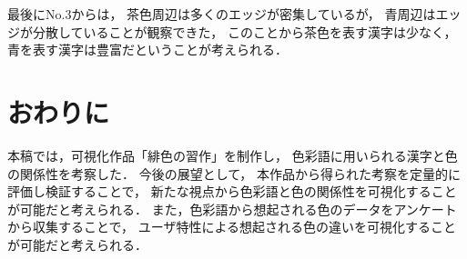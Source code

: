 \documentclass[a4j,twocolumn]{ujarticle} %
\newcommand{\workname}{緋色の習作}
\newcommand{\colorname}{色彩語}
\newcommand{\mysection}[1]{\vspace{-23pt}\section{#1}\vspace{-5pt}}
\begin{document}
最後にNo.3からは，
茶色周辺は多くのエッジが密集しているが，
青周辺はエッジが分散していることが観察できた，
このことから茶色を表す漢字は少なく，青を表す漢字は豊富だということが考えられる．

\mysection{おわりに}

本稿では，可視化作品「\workname{}」を制作し，
\colorname{}に用いられる漢字と色の関係性を考察した．
今後の展望として，
本作品から得られた考察を定量的に評価し検証することで，
新たな視点から\colorname{}と色の関係性を可視化することが可能だと考えられる．
また，\colorname{}から想起される色のデータをアンケートから収集することで，
ユーザ特性による想起される色の違いを可視化することが可能だと考えられる．

\vspace{-2zh}




\end{document}

